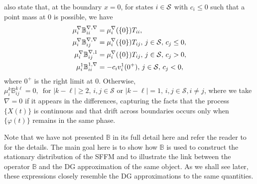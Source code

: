 \cite{bo2014} also state that, at the boundary \(x=0\), for states \(i\in\mathcal{S}\) with \(c_i\leq0\) such that a point mass at \(0\) is possible, we have 
\begin{align*}
	\mu_i^\nabla\mathbb B_{ii}^{\nabla,\nabla} &= \mu_i^\nabla(\{0\})T_{ii},\\
	\mu_i^\nabla\mathbb B_{ij}^{\nabla,\nabla} &= \mu_i^\nabla(\{0\})T_{ij},\,j\in\mathcal{S},\,c_j\leq 0,\\
	\mu_i^\nabla\mathbb B_{ij}^{\nabla,1} &= \mu_i^\nabla(\{0\})T_{ij},\,j\in\mathcal{S},\,c_j> 0,\\
	\mu_i^1\mathbb B_{ii}^{1,\nabla} &= -c_iv_i^1(0^+),\,j\in\mathcal{S},\,c_j< 0,
\end{align*}
where \(0^+\) is the right limit at \(0\). Otherwise, \(\mu_i^{k}\mathbb B_{ij}^{k\ell}=0,\,\mbox{ for } |k-\ell|\geq 2,\,i,j\in\mathcal S \mbox{ or }|k-\ell|=1,\,i,j\in\mathcal S,i\neq j\), where we take \(\nabla = 0\) if it appears in the differences, capturing the facts that the process \(\{X(t)\}\) is continuous and that drift across boundaries occurs only when \(\{\varphi(t)\}\) remains in the same phase. 

Note that we have not presented \(\mathbb B\) in its full detail here and refer the reader to \citep{bo2014} for the details. The main goal here is to show how \(\mathbb B\) is used to construct the stationary distribution of the SFFM and to illustrate the link between the operator \(\mathbb B\) and the DG approximation of the same object. As we shall see later, these expressions closely resemble the DG approximations to the same quantities. 

